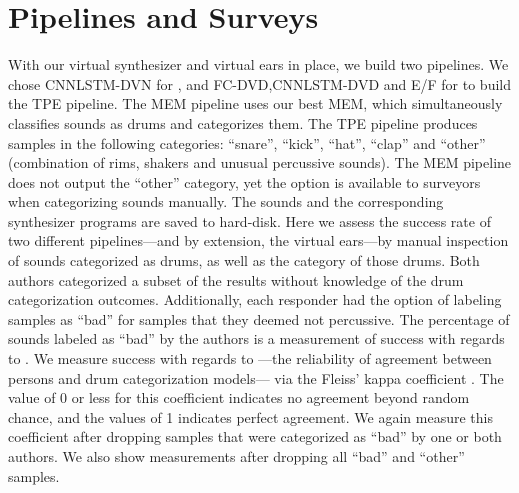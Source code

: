 \documentclass[runningheads,a4paper]{llncs}
\begin{document}
\section{Pipelines and Surveys}
\label{surveys}
With our virtual synthesizer and virtual ears in place, we build two pipelines. We chose CNNLSTM-DVN for , and FC-DVD,CNNLSTM-DVD and E/F for  to build the TPE pipeline. The MEM pipeline uses our best MEM, which simultaneously classifies sounds as drums and categorizes them. 
The TPE pipeline produces samples in the following categories: \enquote{snare}, \enquote{kick}, \enquote{hat}, \enquote{clap} and \enquote{other} (combination of rims, shakers and unusual percussive sounds). The MEM pipeline does not output the \enquote{other} category, yet the option is available to surveyors when categorizing sounds manually.   
The sounds and the corresponding synthesizer programs are saved to hard-disk. Here we assess the success rate of two different pipelines---and by extension, the virtual ears---by manual inspection of sounds categorized as drums, as well as the category of those drums. Both authors categorized a subset of the results without knowledge of the drum categorization outcomes. Additionally, each responder had the option of labeling samples as \enquote{bad} for samples that they deemed not percussive.  The percentage of sounds labeled as \enquote{bad} by the authors is a measurement of success with regards to . We measure success with regards to ---the reliability of agreement between persons and drum categorization models--- via the Fleiss' kappa coefficient \cite{fleiss1971measuring}. The value of 0 or less for this coefficient indicates no agreement beyond random chance, and the values of 1 indicates perfect agreement. We again measure this coefficient after dropping samples that were categorized as \enquote{bad} by one or both authors. We also show measurements after dropping all \enquote{bad} and \enquote{other} samples.
\end{document}
